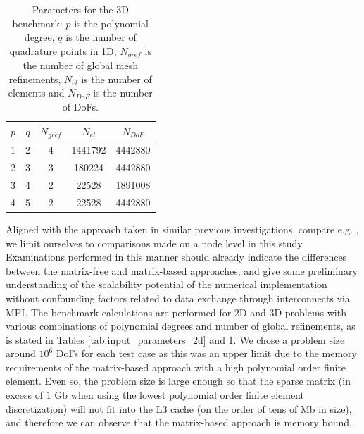 \documentclass[times,doublespace]{nmeauth}
\begin{document}
\begin{table}
  \centering
  \begin{tabular}{ccccc}
  \hline
    $p$ & $q$ & $N_{gref}$ & $N_{el}$ & $N_{DoF}$ \\
  \hline
    1 & 2 & 4 & 1441792 & 4442880 \\
    2 & 3 & 3 & 180224 & 4442880 \\
    3 & 4 & 2 & 22528 & 1891008 \\
    4 & 5 & 2 & 22528 & 4442880 \\
  \hline
  \end{tabular}
  \caption{Parameters for the 3D benchmark: $p$ is the polynomial degree,
  $q$ is the number of quadrature points in 1D, $N_{gref}$ is the number of global mesh refinements, $N_{el}$ is the number of elements and $N_{DoF}$ is the number of DoFs.
  }
  \label{tab:input_parameters_3d}
\end{table}

Aligned with the approach taken in similar previous investigations, compare e.g. \cite{kronbichler2017fast},
we limit ourselves to comparisons made on a node level in this study.
Examinations performed in this manner should already indicate the differences between the matrix-free and matrix-based approaches, and give some preliminary understanding of the scalability potential of the numerical implementation without confounding factors related to data exchange through interconnects via MPI.
The benchmark calculations are performed for 2D and 3D problems with various combinations of polynomial degrees and number of global refinements, as is stated in Tables \ref{tab:input_parameters_2d} and \ref{tab:input_parameters_3d}.
We chose a problem size around $10^6$ DoFs for each test case as this was an upper limit due to the memory requirements of the matrix-based approach with a high polynomial order finite element.
Even so, the problem size is large enough so that the sparse matrix (in excess of $1$ Gb when using the lowest polynomial order finite element discretization) will not fit into the L3 cache (on the order of tens of Mb in size), and therefore we can observe that the matrix-based approach is memory bound.
\end{document}
